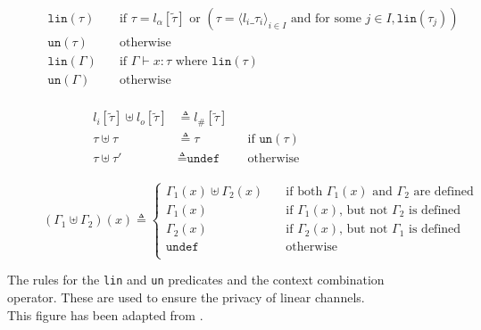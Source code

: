 \documentclass{l4proj}
\begin{document}
\begin{figure}[H]
\begin{subfigure}{\textwidth}
\begin{align*}
\texttt{lin}(\tau) &\quad \text{if } \tau = l_{\alpha}[\tilde{\tau}] \text{ or } (\tau = \langle l_{i}\_\tau_{i} \rangle _{i \in I} \text{ and for some } j \in I, \texttt{lin}(\tau_{j}))\\
\texttt{un}(\tau) &\quad \text{otherwise} \\
\texttt{lin}(\Gamma) &\quad \text{if }\Gamma \vdash x : \tau \text{ where }\texttt{lin}(\tau)\\
\texttt{un}(\Gamma) &\quad \text{otherwise} \\
\end{align*}
\end{subfigure}
\begin{subfigure}{\textwidth}
\begin{align*}
l_{i}[\tilde{\tau}] \uplus l_{o}[\tilde{\tau}] &\triangleq l_{\#}[\tilde{\tau}] \\
\tau \uplus \tau &\triangleq \tau & &\text{if } \texttt{un}(\tau) \\
\tau \uplus \tau' &\triangleq \texttt{undef} & &\text{otherwise} \\
\end{align*}
\end{subfigure}
\begin{subfigure}{\textwidth}
\[ (\Gamma_{1} \uplus \Gamma_{2})(x) \triangleq 
\begin{cases}
\Gamma_{1}(x) \uplus \Gamma_{2}(x) & \quad \text{if both } \Gamma_{1}(x) \text{ and } \Gamma_{2} \text{ are defined} \\
\Gamma_{1}(x) & \quad \text{if } \Gamma_{1}(x) \text{, but not } \Gamma_{2} \text{ is defined} \\
\Gamma_{2}(x) & \quad \text{if } \Gamma_{2}(x) \text{, but not } \Gamma_{1} \text{ is defined} \\
\texttt{undef} & \quad \text{otherwise} \\
\end{cases} \]
\end{subfigure}
\caption{The rules for the \texttt{lin} and \texttt{un} predicates and the context combination operator. These are used to ensure the privacy of linear channels. This figure has been adapted from \citet{DARDHA2017253}.}
\label{fig:combine}
\end{figure}
\end{document}
